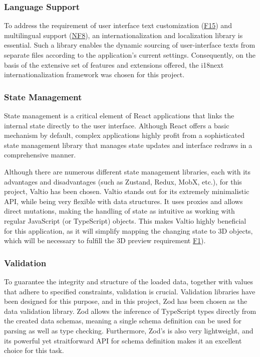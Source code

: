 \subsubsection{Language Support} \label{section:i18n}

To address the requirement of user interface text customization (\hyperref[itm:F15]{F15}) and multilingual support (\hyperref[itm:NF8]{NF8}), an internationalization and localization library is essential. Such a library enables the dynamic sourcing of user-interface texts from separate files according to the application's current settings. Consequently, on the basis of the extensive set of features and extensions offered, the i18next internationalization framework was chosen for this project. \cite{Krukowski2023}

\subsubsection{State Management}

State management is a critical element of React applications that links the internal state directly to the user interface. Although React offers a basic mechanism by default, complex applications highly profit from a sophisticated state management library that manages state updates and interface redraws in a comprehensive manner. \cite{Ceddia2021}

Although there are numerous different state management libraries, each with its advantages and disadvantages (such as Zustand, Redux, MobX, etc.), for this project, Valtio has been chosen. Valtio stands out for its extremely minimalistic API, while being very flexible with data structures. It uses proxies and allows direct mutations, making the handling of state as intuitive as working with regular JavaScript (or TypeScript) objects. This makes Valtio highly beneficial for this application, as it will simplify mapping the changing state to 3D objects, which will be necessary to fulfill the 3D preview requirement \hyperref[itm:F1]{F1}). \cite{Adepoju2023}

\subsubsection{Validation} \label{section:zod}

To guarantee the integrity and structure of the loaded data, together with values that adhere to specified constraints, validation is crucial. Validation libraries have been designed for this purpose, and in this project, Zod has been chosen as the data validation library. Zod allows the inference of TypeScript types directly from the created data schemas, meaning a single schema definition can be used for parsing as well as type checking. Furthermore, Zod's is also very lightweight, and its powerful yet straitforward API for schema definition makes it an excellent choice for this task. \cite{Bhimani2023}


